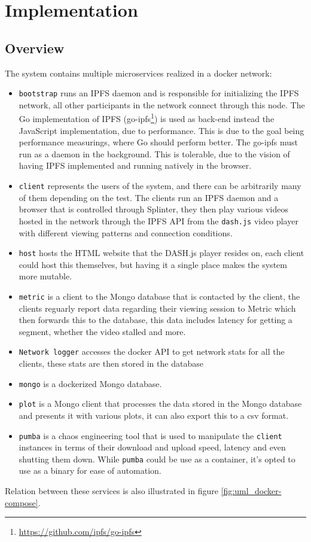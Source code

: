 \chapter{Implementation}
\label{cha:implementation}
\section{Overview}
\label{sec:impl-overview}
The system  contains multiple microservices realized in a docker network:
\begin{itemize}
    \item \texttt{bootstrap} runs an IPFS daemon and is responsible for initializing the IPFS network, all other participants in the network connect through this node. 
    The Go implementation of \acs{IPFS} (go-ipfs\footnote{\url{https://github.com/ipfs/go-ipfs}}) is used as back-end instead the JavaScript implementation, due to performance. This is due to the goal being performance measurings, where Go should perform better. The go-ipfs must run as a daemon in the background. This is tolerable, due to the vision of having IPFS implemented and running natively in the browser.
    \item \texttt{client} represents the users of the system, and there can be arbitrarily many of them depending on the test. The clients run an IPFS daemon and a browser that is controlled through Splinter, they then play various videos hosted in the network through the IPFS \acs{API} from the \texttt{dash.js} video player with different viewing patterns and connection conditions.
    \item \texttt{host} hosts the \ac{HTML} website that the DASH.js player resides on, each client could host this themselves, but having it a single place makes the system more mutable.
    \item \texttt{metric} is a client to the Mongo database that is contacted by the client, the clients reguarly report data regarding their viewing session to Metric which then forwards this to the database, this data includes latency for getting a segment, whether the video stalled and more.
    \item \texttt{Network logger} accesses the docker \acs{API} to get network stats for all the clients, these stats are then stored in the database
    \item \texttt{mongo} is a dockerized Mongo database.
    \item \texttt{plot} is a Mongo client that processes the data stored in the Mongo database and presents it with various plots, it can also export this to a csv format.
    \item \texttt{pumba} is a chaos engineering tool that is used to manipulate the \texttt{client} instances in terms of their download and upload speed, latency and even shutting them down. While \texttt{pumba} could be use as a container, it's opted to use as a binary for ease of automation. 
\end{itemize}
Relation between these services is also  illustrated in figure \ref{fig:uml_docker-compose}.

